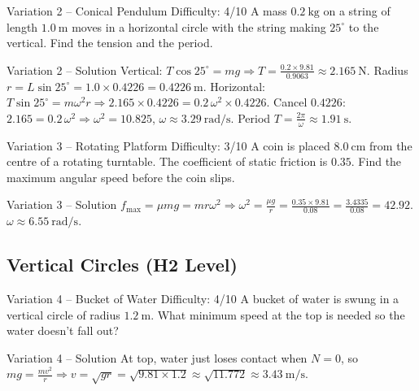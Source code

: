 \documentclass[11pt]{beamer}
\begin{document}
\begin{frame}[shrink=15]{Variation 2 – Conical Pendulum \hfill Difficulty: 4/10}
A mass $0.2\ \mathrm{kg}$ on a string of length $1.0\ \mathrm{m}$ moves in a horizontal circle with the string making $25^\circ$ to the vertical. Find the tension and the period.
\end{frame}

\begin{frame}{Variation 2 – Solution}
Vertical: $T\cos25^\circ = mg \Rightarrow T = \frac{0.2\times9.81}{0.9063} \approx 2.165\ \mathrm{N}$.
Radius $r = L\sin25^\circ = 1.0\times0.4226 = 0.4226\ \mathrm{m}$.
Horizontal: $T\sin25^\circ = m\omega^2 r \Rightarrow 2.165\times0.4226 = 0.2\,\omega^2\times0.4226$.
Cancel $0.4226$: $2.165 = 0.2\,\omega^2 \Rightarrow \omega^2 = 10.825$, $\omega \approx 3.29\ \mathrm{rad/s}$.
Period $T = \frac{2\pi}{\omega} \approx 1.91\ \mathrm{s}$.
\end{frame}

\begin{frame}[shrink=15]{Variation 3 – Rotating Platform \hfill Difficulty: 3/10}
A coin is placed $8.0\ \mathrm{cm}$ from the centre of a rotating turntable. The coefficient of static friction is $0.35$. Find the maximum angular speed before the coin slips.
\end{frame}

\begin{frame}{Variation 3 – Solution}
$f_{\max} = \mu mg = m r \omega^2 \Rightarrow \omega^2 = \frac{\mu g}{r} = \frac{0.35\times9.81}{0.08} = \frac{3.4335}{0.08} = 42.92$.
$\omega \approx 6.55\ \mathrm{rad/s}$.
\end{frame}

\subsection{Vertical Circles (H2 Level)}

\begin{frame}[shrink=15]{Variation 4 – Bucket of Water \hfill Difficulty: 4/10}
A bucket of water is swung in a vertical circle of radius $1.2\ \mathrm{m}$. What minimum speed at the top is needed so the water doesn't fall out?
\end{frame}

\begin{frame}{Variation 4 – Solution}
At top, water just loses contact when $N=0$, so $mg = \frac{mv^2}{r} \Rightarrow v = \sqrt{gr} = \sqrt{9.81\times1.2} \approx \sqrt{11.772} \approx 3.43\ \mathrm{m/s}$.
\end{frame}
\end{document}
